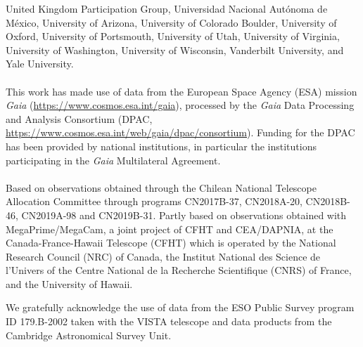 \documentclass[onecolumn]{aa}
\begin{document}
\begin{acknowledgements}
United Kingdom Participation Group,
Universidad Nacional Aut\'onoma de M\'exico, University of Arizona, 
University of Colorado Boulder, University of Oxford, University of Portsmouth, 
University of Utah, University of Virginia, University of Washington, University of Wisconsin, 
Vanderbilt University, and Yale University.
\\\\
This work has made use of data from the European Space Agency (ESA) mission {\it Gaia} (\url{https://www.cosmos.esa.int/gaia}), processed by the {\it Gaia} Data Processing and Analysis Consortium (DPAC, \url{https://www.cosmos.esa.int/web/gaia/dpac/consortium}). Funding for the DPAC has been provided by national institutions, in particular the institutions participating in the {\it Gaia} Multilateral Agreement.
\\\\
Based on observations obtained through the Chilean National Telescope Allocation Committee through programs  CN2017B-37, CN2018A-20, CN2018B-46, CN2019A-98 and CN2019B-31.
Partly based on observations obtained with MegaPrime/MegaCam, a joint project of CFHT and CEA/DAPNIA, at the Canada-France-Hawaii Telescope (CFHT) which is operated by the National Research Council (NRC) of Canada, the Institut National des Science de l'Univers of the Centre National de la Recherche Scientifique (CNRS) of France, and the University of Hawaii.

We gratefully acknowledge the use of data from the ESO Public Survey program ID 179.B-2002 taken with the VISTA telescope and data products from the Cambridge Astronomical Survey Unit.
\end{acknowledgements}

	
%
%
\end{document}
